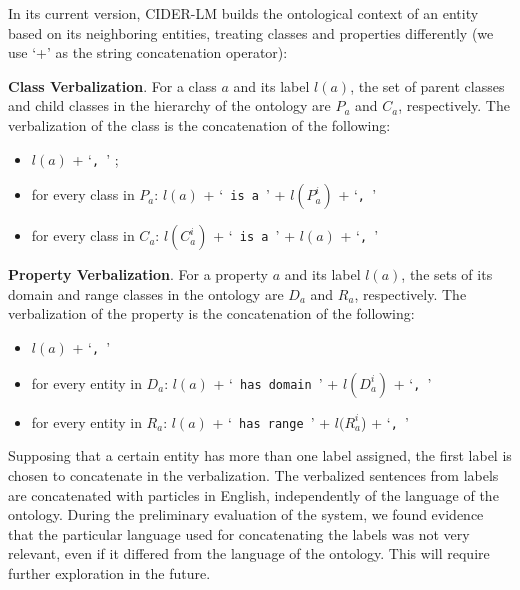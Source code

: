 \documentclass[
]{ceurart}
\begin{document}
In its current version, CIDER-LM builds the ontological context of an entity based on its neighboring entities, treating classes and properties differently (we use `+' as the string concatenation operator):

\textbf{Class Verbalization}. For a class $a$ and its label $l(a)$, the set of parent classes and child classes in the hierarchy of the ontology are $P_a$ and $C_a$, respectively. The verbalization of the class is the concatenation of the following:

\begin{itemize}
    \item $l(a)$ + `\verb|, |' ;
    \item for every class in $P_a$: $l(a)$ + `\verb| is a |' + $l(P_a^i)$ + `\verb|, |' 
    \item for every class in $C_a$: $l(C_a^i)$ + `\verb| is a |' + $l(a)$ + `\verb|, |' 
\end{itemize}

\textbf{Property Verbalization}. For a property $a$ and its label $l(a)$, the sets of its domain and range classes in the ontology are $D_a$ and $R_a$, respectively. The verbalization of the property is the concatenation of the following:

\begin{itemize}
    \item $l(a)$ + `\verb|, |' 
    \item for every entity in $D_a$: $l(a)$ + `\verb| has domain |' + $l(D_a^i)$ + `\verb|, |' 
    \item for every entity in $R_a$: $l(a)$ + `\verb| has range |' + $l(R_a^i$) + `\verb|, |' 
\end{itemize}

Supposing that a certain entity has more than one label assigned, the first label is chosen to concatenate in the verbalization.
The verbalized sentences from labels are concatenated with particles in English, independently of the language of the ontology. During the preliminary evaluation of the system, we found evidence that the particular language used for concatenating the labels was not very relevant, even if it differed from the language of the ontology. This will require further exploration in the future. %
\end{document}
